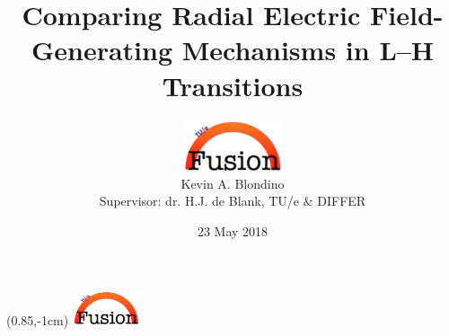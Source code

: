 \documentclass[10pt]{beamer}
\title[$E_r$-Generating Mechanisms in L-H Transitions]{Comparing Radial Electric Field-Generating Mechanisms in L--H Transitions}
\author[K.A. Blondino]{\includegraphics[height=1.5cm]{../Graphics/tue_fusion_logo.png} \\ \vspace*{3mm}
	Kevin A. Blondino \\ \vspace*{3mm}
	Supervisor: dr. H.J. de Blank, TU/e \& DIFFER}
\institute[TU/e]{Eindhoven University of Technology \\
	\medskip
	\textit{k.blondino@student.tue.nl}}
\date{23 May 2018}
\begin{document}
\begin{frame} %
\setcounter{framenumber}{0}
\titlepage
\end{frame}

{
\begin{textblock*}{100mm}(0.85\textwidth,-1cm)
	\includegraphics[height=1cm,width=2cm]{../Graphics/tue_fusion_logo.png}
\end{textblock*}
}


\end{document}
